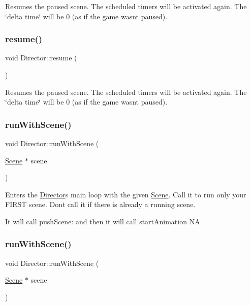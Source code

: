 Resumes the paused scene. The scheduled timers will be activated again. The \char`\"{}delta time\char`\"{} will be 0 (as if the game wasn\textquotesingle{}t paused). \mbox{\label{classDirector_a851df0aed8d550cc85159063b0c85dac}} 
\subsubsection{\texorpdfstring{resume()}{resume()}\hspace{0.1cm}{\footnotesize\ttfamily [2/2]}}
{\footnotesize\ttfamily void Director\+::resume (\begin{DoxyParamCaption}{ }\end{DoxyParamCaption})}

Resumes the paused scene. The scheduled timers will be activated again. The \char`\"{}delta time\char`\"{} will be 0 (as if the game wasn\textquotesingle{}t paused). \mbox{\label{classDirector_a893e73a440a7832097e858bf8b9dff8a}} 
\subsubsection{\texorpdfstring{run\+With\+Scene()}{runWithScene()}\hspace{0.1cm}{\footnotesize\ttfamily [1/2]}}
{\footnotesize\ttfamily void Director\+::run\+With\+Scene (\begin{DoxyParamCaption}\item[{\hyperlink{classScene}{Scene} $\ast$}]{scene }\end{DoxyParamCaption})}

Enters the \hyperlink{classDirector}{Director}\textquotesingle{}s main loop with the given \hyperlink{classScene}{Scene}. Call it to run only your F\+I\+R\+ST scene. Don\textquotesingle{}t call it if there is already a running scene.

It will call push\+Scene\+: and then it will call start\+Animation  NA \mbox{\label{classDirector_a893e73a440a7832097e858bf8b9dff8a}} 
\subsubsection{\texorpdfstring{run\+With\+Scene()}{runWithScene()}\hspace{0.1cm}{\footnotesize\ttfamily [2/2]}}
{\footnotesize\ttfamily void Director\+::run\+With\+Scene (\begin{DoxyParamCaption}\item[{\hyperlink{classScene}{Scene} $\ast$}]{scene }\end{DoxyParamCaption})}

